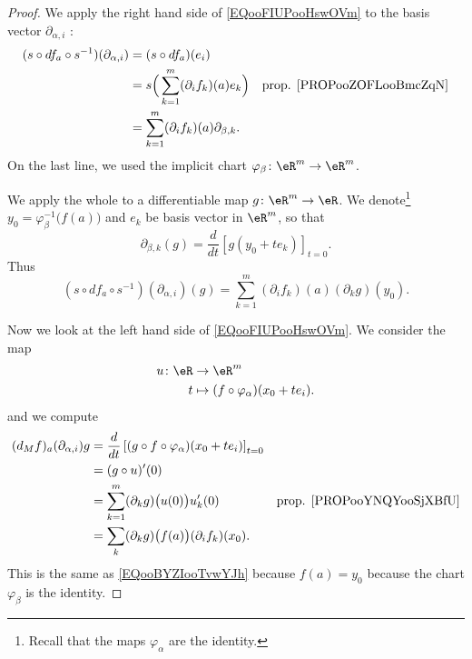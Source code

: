 \begin{proof}
	We apply the right hand side of \eqref{EQooFIUPooHswOVm} to the basis vector \( \partial_{\alpha, i}\) :
	\begin{subequations}
		\begin{align}
			(s\circ df_a\circ s^{-1})(\partial_{\alpha, i}) & =(s\circ df_a)(e_i)                                                                        \\
			                                                & =s\Big( \sum_{k=1}^m(\partial_if_k)(a)e_k \Big)    & \text{prop. \ref{PROPooZOFLooBmcZqN}} \\
			                                                & =\sum_{k=1}^m(\partial_if_k)(a)\partial_{\beta,k}.
		\end{align}
	\end{subequations}
	On the last line, we used the implicit chart \(\varphi_{\beta} \colon \eR^m\to \eR^m  \).

	We apply the whole to a differentiable map \(g \colon \eR^m\to \eR  \). We denote\footnote{Recall that the maps \( \varphi_{\alpha}\) are the identity.} \( y_0=\varphi_{\beta}^{-1}\big( f(a) \big)\) and \( e_k\) be basis vector in \( \eR^m\), so that
	\begin{equation}
		\partial_{\beta, k}(g)=\frac{d}{dt} \left[ g(y_0+te_k)  \right]_{t=0}.
	\end{equation}
	Thus
	\begin{equation}		\label{EQooBYZIooTvwYJh}
		(s\circ df_a\circ s^{-1})(\partial_{\alpha,i})(g)=\sum_{k=1}^m(\partial_if_k)(a)(\partial_kg)(y_0).
	\end{equation}

	Now we look at the left hand side of \eqref{EQooFIUPooHswOVm}. We consider the map
	\begin{equation}
		\begin{aligned}
			u\colon \eR & \to \eR^m                                   \\
			t           & \mapsto (f\circ\varphi_{\alpha})(x_0+te_i).
		\end{aligned}
	\end{equation}
	and we compute
	\begin{subequations}
		\begin{align}
			(d_Mf)_a(\partial_{\alpha, i})g & =\frac{d}{dt} \left[ (g\circ f\circ\varphi_{\alpha})(x_0+te_i)  \right]_{t=0}                                         \\
			                                & =(g\circ u)'(0)                                                                                                       \\
			                                & =\sum_{k=1}^m(\partial_kg)\big( u(0) \big)u_k'(0)                             & \text{prop. \ref{PROPooYNQYooSjXBfU}} \\
			                                & =\sum_k(\partial_kg)\big( f(a) \big)(\partial_if_k)(x_0).
		\end{align}
	\end{subequations}
	This is the same as \eqref{EQooBYZIooTvwYJh} because \( f(a)=y_0\) because the chart \( \varphi_{\beta}\) is the identity.
\end{proof}


